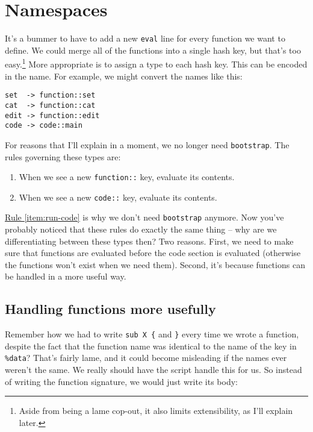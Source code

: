 \documentclass{report}
\newcommand{\Ref}[2]{\hyperref[#2]{#1 \ref*{#2}}}
\begin{document}
\chapter{Namespaces}\label{sec:namespaces}
  It's a bummer to have to add a new {\tt eval} line for every function we want to define. We could merge all of the functions into a single hash key, but that's too easy.\footnote{Aside from
  being a lame cop-out, it also limits extensibility, as I'll explain later.} More appropriate is to assign a type to each hash key. This can be encoded in the name. For example, we might
  convert the names like this:

\begin{verbatim}
set  -> function::set
cat  -> function::cat
edit -> function::edit
code -> code::main
\end{verbatim}

  For reasons that I'll explain in a moment, we no longer need {\tt bootstrap}. The rules governing these types are:

\begin{enumerate}
\item{When we see a new {\tt function::} key, evaluate its contents.}
\item{When we see a new {\tt code::} key, evaluate its contents. \label{item:run-code}}
\end{enumerate}

  \Ref{Rule}{item:run-code} is why we don't need {\tt bootstrap} anymore. Now you've probably noticed that these rules do exactly the same thing -- why are we differentiating between these
  types then? Two reasons. First, we need to make sure that functions are evaluated before the code section is evaluated (otherwise the functions won't exist when we need them). Second, it's
  because functions can be handled in a more useful way.

\section{Handling functions more usefully}\label{sec:namespaces-handling-functions-more-usefully}
    Remember how we had to write \verb|sub X {| and \verb|}| every time we wrote a function, despite the fact that the function name was identical to the name of the key in \verb|%data|?
    That's fairly lame, and it could become misleading if the names ever weren't the same. We really should have the script handle this for us. So instead of writing the function signature, we
    would just write its body:
\end{document}

